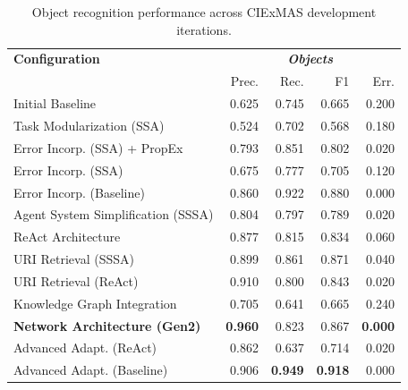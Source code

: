 \documentclass[a4paper,oneside,bibliography=totoc]{scrbook}
\begin{document}
\begin{table}[h]
  \centering
  \begin{tabular}{p{6cm}|rrrr}
    \toprule
    \textbf{Configuration}               & \multicolumn{4}{c}{\textit{\textbf{Objects}}}                                                    \\
                                         & Prec.                                         & Rec.           & F1             & Err.           \\
    \midrule
    Initial Baseline                     & 0.625                                         & 0.745          & 0.665          & 0.200          \\
    Task Modularization (SSA)            & 0.524                                         & 0.702          & 0.568          & 0.180          \\
    Error Incorp. (SSA) + PropEx         & 0.793                                         & 0.851          & 0.802          & 0.020          \\
    Error Incorp. (SSA)                  & 0.675                                         & 0.777          & 0.705          & 0.120          \\
    Error Incorp. (Baseline)             & 0.860                                         & 0.922          & 0.880          & 0.000          \\
    Agent System Simplification (SSSA)   & 0.804                                         & 0.797          & 0.789          & 0.020          \\
    ReAct Architecture                   & 0.877                                         & 0.815          & 0.834          & 0.060          \\
    URI Retrieval (SSSA)                 & 0.899                                         & 0.861          & 0.871          & 0.040          \\
    URI Retrieval (ReAct)                & 0.910                                         & 0.800          & 0.843          & 0.020          \\
    Knowledge Graph Integration          & 0.705                                         & 0.641          & 0.665          & 0.240          \\
    \textbf{Network Architecture (Gen2)} & \textbf{0.960}                                & 0.823          & 0.867          & \textbf{0.000} \\
    Advanced Adapt. (ReAct)              & 0.862                                         & 0.637          & 0.714          & 0.020          \\
    Advanced Adapt. (Baseline)           & 0.906                                         & \textbf{0.949} & \textbf{0.918} & 0.000          \\
    \bottomrule
  \end{tabular}
  \caption{Object recognition performance across CIExMAS development iterations.}
  \label{tab:evaluation_objects_iterations}
\end{table}
\end{document}
